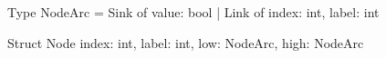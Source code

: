 \begin{blstlisting}[language=pseudo, numbers=none]
  Type NodeArc = Sink of { value: bool }
               | Link of { index: int, label: int }

  Struct Node { index: int, label: int, low: NodeArc, high: NodeArc }
\end{blstlisting}
